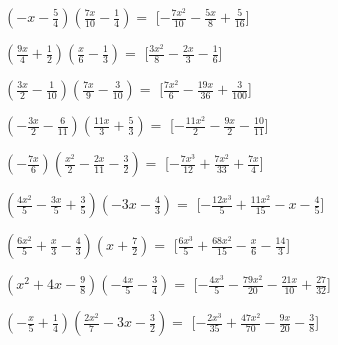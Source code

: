 \begin{esercizio}
\begin{enumeratea}
\item \(\left(- x - \frac{5}{4}\right)\left(\frac{7 x}{10} - 
\frac{1}{4}\right)=\)
  \hfill [\(- \frac{7 x^{2}}{10} - \frac{5 x}{8} + \frac{5}{16}\)]
\item \(\left(\frac{9 x}{4} + \frac{1}{2}\right)\left(\frac{x}{6} - 
\frac{1}{3}\right)=\)
  \hfill [\(\frac{3 x^{2}}{8} - \frac{2 x}{3} - \frac{1}{6}\)]
\item \(\left(\frac{3 x}{2} - \frac{1}{10}\right)\left(\frac{7 x}{9} - 
\frac{3}{10}\right)=\)
  \hfill [\(\frac{7 x^{2}}{6} - \frac{19 x}{36} + \frac{3}{100}\)]
\item \(\left(- \frac{3 x}{2} - \frac{6}{11}\right)\left(\frac{11 x}{3} + 
\frac{5}{3}\right)=\)
  \hfill [\(- \frac{11 x^{2}}{2} - \frac{9 x}{2} - \frac{10}{11}\)]
\item \(\left(- \frac{7 x}{6}\right)\left(\frac{x^{2}}{2} - \frac{2 x}{11} 
- \frac{3}{2}\right)=\)
  \hfill [\(- \frac{7 x^{3}}{12} + \frac{7 x^{2}}{33} + \frac{7 x}{4}\)]
\item \(\left(\frac{4 x^{2}}{5} - \frac{3 x}{5} + \frac{3}{5}\right)\left(- 
3 x - \frac{4}{3}\right)=\)
  \hfill [\(- \frac{12 x^{3}}{5} + \frac{11 x^{2}}{15} - x - \frac{4}{5}\)]
\item \(\left(\frac{6 x^{2}}{5} + \frac{x}{3} - \frac{4}{3}\right)\left(x + 
\frac{7}{2}\right)=\)
  \hfill [\(\frac{6 x^{3}}{5} + \frac{68 x^{2}}{15} - \frac{x}{6} - 
\frac{14}{3}\)]
\item \(\left(x^{2} + 4 x - \frac{9}{8}\right)\left(- \frac{4 x}{5} - 
\frac{3}{4}\right)=\)
  \hfill [\(- \frac{4 x^{3}}{5} - \frac{79 x^{2}}{20} - \frac{21 x}{10} + 
\frac{27}{32}\)]
\item \(\left(- \frac{x}{5} + \frac{1}{4}\right)\left(\frac{2 x^{2}}{7} - 3 
x - \frac{3}{2}\right)=\)
  \hfill [\(- \frac{2 x^{3}}{35} + \frac{47 x^{2}}{70} - \frac{9 x}{20} - 
\frac{3}{8}\)]

\end{enumeratea}
\end{esercizio}
